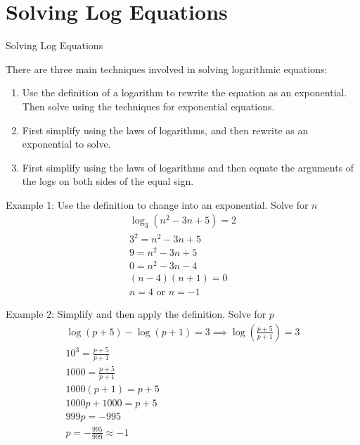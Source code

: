 \documentclass{article}
\begin{document}
\section{Solving Log Equations}
\begin{lessonbox}{Solving Log Equations}
    
There are three main techniques involved in solving logarithmic equations:
\begin{enumerate}
    \item Use the definition of a logarithm to rewrite the equation as an exponential. Then solve using the techniques for exponential equations.
    \item First simplify using the laws of logarithms, and then rewrite as an exponential to solve.
    \item First simplify using the laws of logarithms and then equate the arguments of the logs on both sides of the equal sign.
\end{enumerate}
\end{lessonbox}

\begin{examplebox}{Example 1: Use the definition to change into an exponential. Solve for \( n \)}
\begin{align*}
\log_3{(n^2 - 3n + 5)} = 2 \\
3^2 = n^2 - 3n + 5 \\
9 = n^2 - 3n + 5 \\
0 = n^2 - 3n - 4 \\
(n-4)(n+1) = 0 \\
n = 4 \text{ or } n = -1
\end{align*}

\end{examplebox}

\begin{examplebox}{Example 2: Simplify and then apply the definition. Solve for \( p \)}
\begin{align*}
\log{(p+5)} - \log{(p+1)} = 3 \implies \log{\left(\frac{p+5}{p+1}\right)} = 3 \\
10^3 = \frac{p+5}{p+1} \\
1000 = \frac{p+5}{p+1}\\
1000(p+1) = p + 5 \\
1000p + 1000 = p + 5 \\
999p = -995\\
p = -\frac{995}{999} \approx -1
\end{align*}

\end{examplebox}
\end{document}
